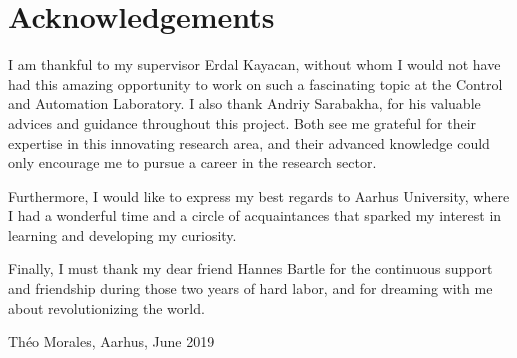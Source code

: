 \thispagestyle{plain}			%
\section*{Acknowledgements}

I am thankful to my supervisor Erdal Kayacan, without whom I would not have had
this amazing opportunity to work on such a fascinating topic at the Control and
Automation Laboratory. I also thank Andriy Sarabakha, for his valuable advices
and guidance throughout this project. Both see me grateful for their expertise
in this innovating research area, and their advanced knowledge could only
encourage me to pursue a career in the research sector.

Furthermore, I would like to express my best regards to Aarhus University,
where I had a wonderful time and a circle of acquaintances that sparked my
interest in learning and developing my curiosity.

Finally, I must thank my dear friend Hannes Bartle for the continuous support
and friendship during those two years of hard labor, and for dreaming with me
about revolutionizing the world. 

\vspace{1.5cm}
\hfill
Théo Morales, Aarhus, June 2019

\newpage				%
\thispagestyle{empty}
\mbox{}
